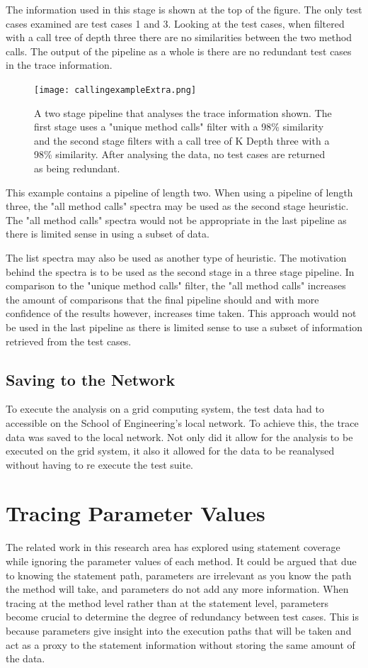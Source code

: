 The information used in this stage is shown at the top of the figure. The only test cases examined are test cases 1 and 3. Looking at the test cases, when filtered with a call tree of depth three there are no similarities between the two method calls. The output of the pipeline as a whole is there are no redundant test cases in the trace information.

\begin{figure}[h]
\texttt{[image: callingexampleExtra.png]}
\caption{A two stage pipeline that analyses the trace information shown. The first stage uses a "unique method calls" filter with a 98\% similarity and the second stage filters with a call tree of K Depth three with a 98\% similarity. After analysing the data, no test cases are returned as being redundant.}
\label{fig:pipelineExample}
\end{figure}

This example contains a pipeline of length two. When using a pipeline of length three, the "all method calls" spectra may be used as the second stage heuristic. The "all method calls" spectra would not be appropriate in the last pipeline as there is limited sense in using a subset of data.

The list spectra may also be used as another type of heuristic. The motivation behind the spectra is to be used as the second stage in a three stage pipeline. In comparison to the "unique method calls" filter, the "all method calls" increases the amount of comparisons that the final pipeline should and with more confidence of the results however, increases time taken. This approach would not be used in the last pipeline as there is limited sense to use a subset of information retrieved from the test cases.



\subsection{Saving to the Network}
To execute the analysis on a grid computing system, the test data had to accessible on the School of Engineering's local network. To achieve this, the trace data was saved to the local network. Not only did it allow for the analysis to be executed on the grid system, it also it allowed for the data to be reanalysed without having to re execute the test suite. 

\section{Tracing Parameter Values}
\label{parameterTrace}
The related work in this research area has explored using statement coverage while ignoring the parameter values of each method. It could be argued that due to knowing the statement path, parameters are irrelevant as you know the path the method will take, and parameters do not add any more information. When tracing at the method level rather than at the statement level, parameters become crucial to determine the degree of redundancy between test cases. This is because parameters give insight into the execution paths that will be taken and act as a proxy to the statement information without storing the same amount of the data.

